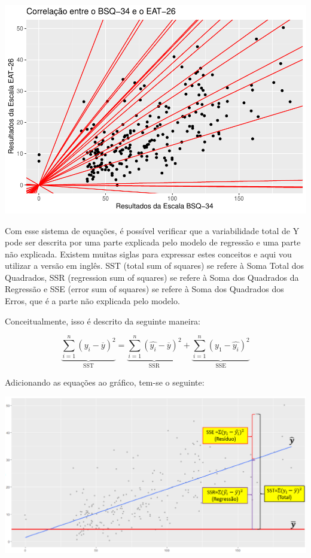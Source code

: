 \documentclass[
]{book}
\begin{document}
\begin{center}\includegraphics{gitbook-demo_files/figure-latex/unnamed-chunk-81-1} \end{center}

Com esse sistema de equações, é possível verificar que a variabilidade total de Y pode ser descrita por uma parte explicada pelo modelo de regressão e uma parte não explicada. Existem muitas siglas para expressar estes conceitos e aqui vou utilizar a versão em inglês. SST (total sum of squares) se refere à Soma Total dos Quadrados, SSR (regression sum of squares) se refere à Soma dos Quadrados da Regressão e SSE (error sum of squares) se refere à Soma dos Quadrados dos Erros, que é a parte não explicada pelo modelo.

Conceitualmente, isso é descrito da seguinte maneira:

\[\underbrace{\sum\limits_{i=1}^{n} (y_i-\overline{y})^2}_\text{SST} = \underbrace{\sum\limits_{i=1}^{n} (\widehat{y_i}-\overline{y})^2}_\text{SSR} + \underbrace{\sum\limits_{i=1}^{n} (y_1-\widehat{y_i})^2}_\text{SSE}\]

Adicionando as equações ao gráfico, tem-se o seguinte:

\includegraphics{./img/cap_reg_equacoes.png}
\end{document}
